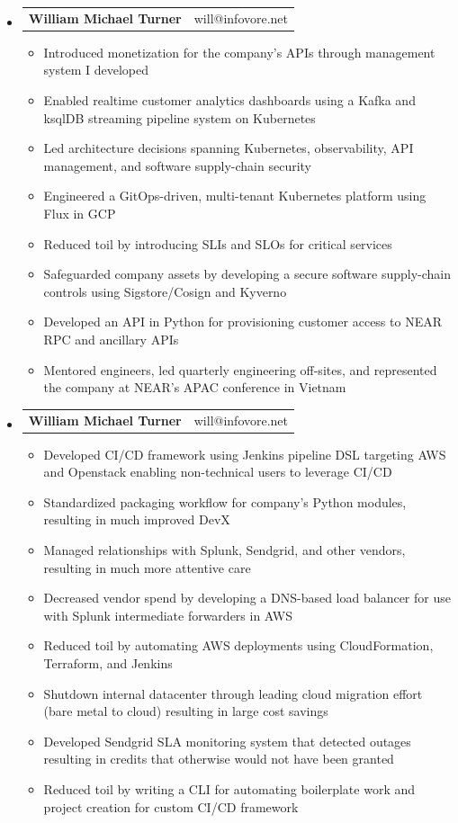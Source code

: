\documentclass[letterpaper,11pt]{article}
\makeatletter
\newcommand{\resitem}[1]{\item #1 \vspace{-1pt}}
\newcommand{\ressubheading}[4]{
\begin{tabular*}{7.3in}{l@{\extracolsep{\fill}}r} \color{myRed}
\textbf{\large William Michael Turner} & will@infovore.net \\
\end{tabular*}\vspace{-5pt}}
\makeatother
\begin{document}
\begin{itemize}
    \item
        \ressubheading{NEAR/Pagoda}{Remote}{Team Leader/Staff Site Reliability Engineer}{March 2022 - January 2024}
            \begin{itemize}
                \resitem{Introduced monetization for the company's APIs through management system I developed}
                \resitem{Enabled realtime customer analytics dashboards using a Kafka and ksqlDB streaming pipeline system on Kubernetes}
                \resitem{Led architecture decisions spanning Kubernetes, observability, API management, and software supply-chain security}
                \resitem{Engineered a GitOps-driven, multi-tenant Kubernetes platform using Flux in GCP}
                \resitem{Reduced toil by introducing SLIs and SLOs for critical services}
                \resitem{Safeguarded company assets by developing a secure software supply-chain controls using Sigstore/Cosign and Kyverno}
                \resitem{Developed an API in Python for provisioning customer access to NEAR RPC and ancillary APIs}
                \resitem{Mentored engineers, led quarterly engineering off-sites, and represented the company at NEAR's APAC conference in Vietnam}
            \end{itemize}
    \newpage
    \item
        \ressubheading{LogMeIn/GoTo}{Remote}{Team Leader/Staff Software Development Engineer - DevSecOps }{October 2016 - March 2022}
            \begin{itemize}
            \resitem{Developed CI/CD framework using Jenkins pipeline DSL targeting AWS and Openstack enabling non-technical users to leverage CI/CD}
            \resitem{Standardized packaging workflow for company's Python modules, resulting in much improved DevX}
            \resitem{Managed relationships with Splunk, Sendgrid, and other vendors, resulting in much more attentive care}
            \resitem{Decreased vendor spend by developing a DNS-based load balancer for use with Splunk intermediate forwarders in AWS}
            \resitem{Reduced toil by automating AWS deployments using CloudFormation, Terraform, and Jenkins}
            \resitem{Shutdown internal datacenter through leading cloud migration effort (bare metal to cloud) resulting in large cost savings}
            \resitem{Developed Sendgrid SLA monitoring system that detected outages resulting in credits that otherwise would not have been granted}
            \resitem{Reduced toil by writing a CLI for automating boilerplate work and project creation for custom CI/CD framework}
    \end{itemize}



\end{itemize}
\end{document}
